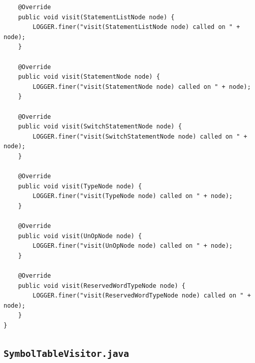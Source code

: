 \documentclass{report}
\begin{document}
\begin{verbatim}
	@Override
	public void visit(StatementListNode node) {
		LOGGER.finer("visit(StatementListNode node) called on " + node);
	}

	@Override
	public void visit(StatementNode node) {
		LOGGER.finer("visit(StatementNode node) called on " + node);
	}

	@Override
	public void visit(SwitchStatementNode node) {
		LOGGER.finer("visit(SwitchStatementNode node) called on " + node);
	}

	@Override
	public void visit(TypeNode node) {
		LOGGER.finer("visit(TypeNode node) called on " + node);
	}

	@Override
	public void visit(UnOpNode node) {
		LOGGER.finer("visit(UnOpNode node) called on " + node);
	}

	@Override
	public void visit(ReservedWordTypeNode node) {
		LOGGER.finer("visit(ReservedWordTypeNode node) called on " + node);
	}
}
\end{verbatim}

\subsection{\texttt{SymbolTableVisitor.java}}
\end{document}
